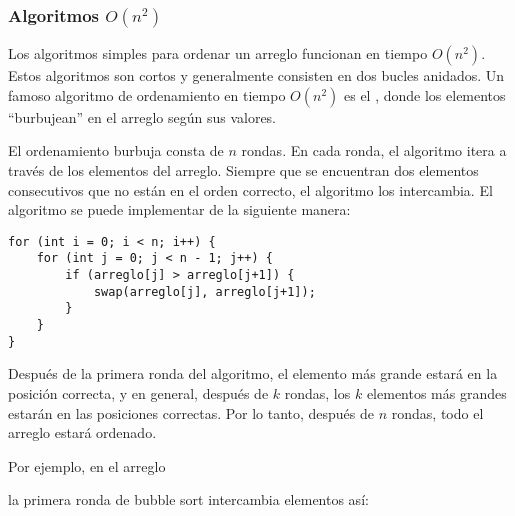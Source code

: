 \subsubsection{Algoritmos $O(n^2)$}


Los algoritmos simples para ordenar un arreglo
funcionan en tiempo $O(n^2)$.
Estos algoritmos son cortos y generalmente
consisten en dos bucles anidados.
Un famoso algoritmo de ordenamiento en tiempo $O(n^2)$
es el , donde los elementos
``burbujean'' en el arreglo según sus valores.

El ordenamiento burbuja consta de $n$ rondas.
En cada ronda, el algoritmo itera a través
de los elementos del arreglo.
Siempre que se encuentran dos elementos consecutivos
que no están en el orden correcto,
el algoritmo los intercambia.
El algoritmo se puede implementar de la siguiente manera:
\begin{lstlisting}
for (int i = 0; i < n; i++) {
    for (int j = 0; j < n - 1; j++) {
        if (arreglo[j] > arreglo[j+1]) {
            swap(arreglo[j], arreglo[j+1]);
        }
    }
}
\end{lstlisting}

Después de la primera ronda del algoritmo,
el elemento más grande estará en la posición correcta,
y en general, después de $k$ rondas, los $k$ elementos más grandes
estarán en las posiciones correctas.
Por lo tanto, después de $n$ rondas, todo el arreglo
estará ordenado.

Por ejemplo, en el arreglo

\begin{center}
\end{center}

\noindent
la primera ronda de bubble sort intercambia elementos así:

\begin{center}
\end{center}

